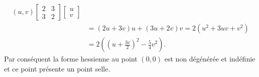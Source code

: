 {\begin{enumerate}
{\begin{align*}
(u,v)\left[\begin{matrix} 
2 & 3\\ 3 &  2
\end{matrix}\right]
\left[\begin{matrix} u \\ v \end{matrix}\right]
\\
&=
(2u+3v)u+(3u+2v)v=2(u^2+3uv+v^2)
\\
&=
2\left(\left(u+\tfrac {3v}2\right)^2 - \tfrac 54 v^2\right) .
\end{align*}
Par cons\'equent la forme hessienne au point $(0,0)$
est non d\'eg\'en\'er\'ee et 
ind\'efinie et ce point pr\'esente  un point selle.}
\end{enumerate}
}